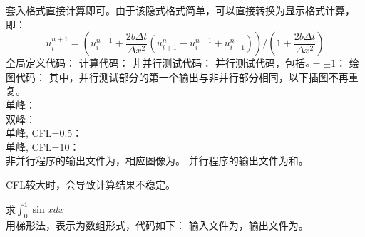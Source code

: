 \documentclass{ctexart}
\begin{document}
\begin{answer}
    套入格式直接计算即可。由于该隐式格式简单，可以直接转换为显示格式计算，即：
    \[u_i^{n+1}=(u_i^{n-1}+\frac{2b\Delta t}{\Delta x^2}(u_{i+1}^n-u_i^{n-1}+u_{i-1}^n))/(1+\frac{2b\Delta t}{\Delta x^2})\]
    全局定义代码：
    计算代码：
    非并行测试代码：
    并行测试代码，包括$s=\pm 1$：
    绘图代码：
    其中，并行测试部分的第一个输出与非并行部分相同，以下插图不再重复。\\
    单峰：
    \\
    双峰：
    \\
    单峰, CFL=0.5：
    \\
    单峰, CFL=10：
    \\
    非并行程序的输出文件为，相应图像为。
    并行程序的输出文件为和。

    CFL较大时，会导致计算结果不稳定。

    求$\int_0^1 \sin x dx$\\

    用梯形法，表示为数组形式，代码如下：
    输入文件为，输出文件为。

\end{answer}
\end{document}
